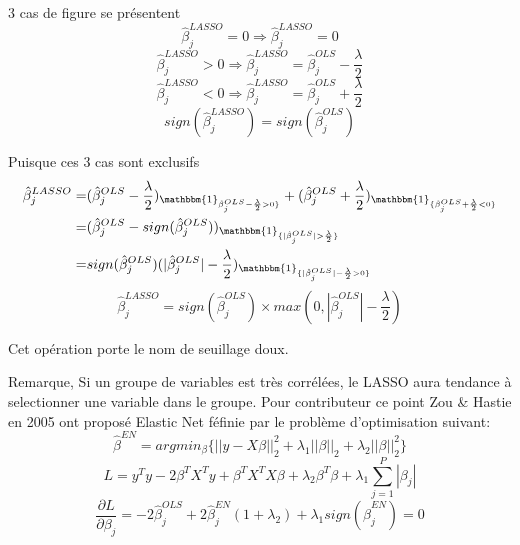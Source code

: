 \documentclass{article}
\begin{document}
3 cas de figure se pr\'esentent
\begin{equation}
\hat{\beta}_j^{LASSO}=0\Rightarrow\hat{\beta}_j^{LASSO}=0
\end{equation}
\begin{equation}
\hat{\beta}_j^{LASSO}>0\Rightarrow\hat{\beta}_j^{LASSO}=\hat{\beta}_j^{OLS}-\frac{\lambda}{2}
\end{equation}
\begin{equation}
\hat{\beta}_j^{LASSO}<0\Rightarrow \hat{\beta}_j^{LASSO}=\hat{\beta}_j^{OLS}+\frac{\lambda}{2}
\end{equation}
\begin{equation}
sign(\hat{\beta}_j^{LASSO})=sign(\hat{\beta}_j^{OLS})
\end{equation}

Puisque ces 3 cas sont exclusifs
\begin{equation}
\begin{split}
	\hat{\beta}_j^{LASSO}=&(\hat{\beta}_j^{OLS}-\frac{\lambda}{2})_{\mathbbm{1}_{\hat{\beta}_j^{OLS}-\frac{\lambda}{2}>0\}}}+(\hat{\beta}_j^{OLS}+\frac{\lambda}{2})_{\mathbbm{1}_{\{\hat{\beta}_j^{OLS}+\frac{\lambda}{2}<0\}}}\\
=&(\hat{\beta}_j^{OLS}-sign(\hat{\beta}_j^{OLS}))_{\mathbbm{1}_{\{|\hat{\beta}_j^{OLS}|>\frac{\lambda}{2}\}}}\\
=&sign(\hat{\beta}_j^{OLS})(|\hat{\beta}_j^{OLS}|-\frac{\lambda}{2})_{\mathbbm{1}_{\{|\hat{\beta}_j^{OLS}|-\frac{\lambda}{2}>0\}}}
\end{split}
\end{equation}
\begin{equation}
\hat{\beta}_j^{LASSO}=sign(\hat{\beta}_j^{OLS})\times max(0,|\hat{\beta}_j^{OLS}|-\frac{\lambda}{2})
\end{equation}

Cet op\'eration porte le nom de seuillage doux.

Remarque, Si un groupe de variables est tr\`es corr\'el\'ees, le LASSO aura tendance \`a selectionner une variable dans le groupe.
Pour contributeur ce point Zou \& Hastie en 2005 ont propos\'e Elastic Net f\'efinie par le probl\`eme d'optimisation suivant:
\begin{equation}
\hat{\beta}^{EN}=argmin_\beta\{||y-X\beta||_2^2+\lambda_1||\beta||_2+\lambda_2||\beta||_2^2\}
\end{equation}
\begin{equation}
L=y^Ty-2\beta^TX^Ty+\beta^TX^TX\beta+\lambda_2\beta^T\beta+\lambda_1\sum_{j=1}^P|\beta_j|
\end{equation}
\begin{equation}
\frac{\partial L}{\partial \beta_j}=-2\hat{\beta}_j^{OLS}+2\hat{\beta}_j^{EN}(1+\lambda_2)+\lambda_1 sign(\hat{\beta}_j^{EN})=0
\end{equation}
\end{document}
